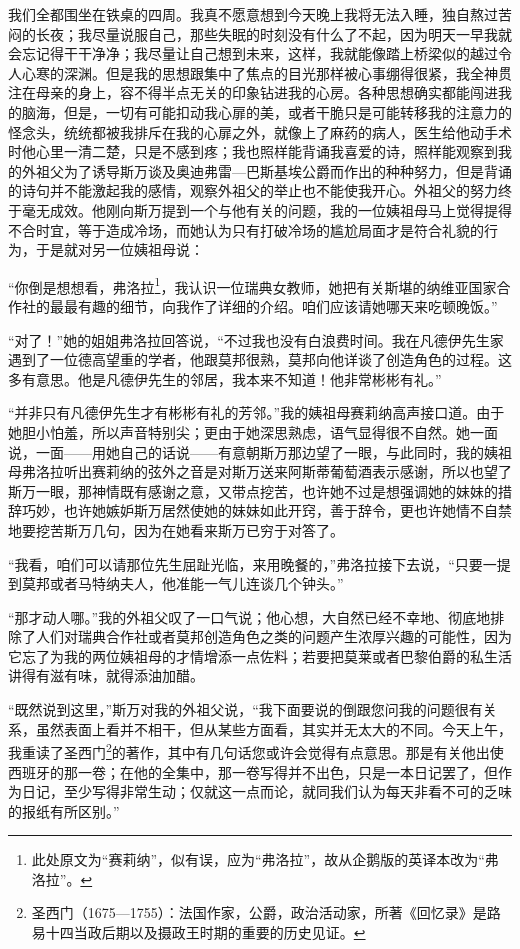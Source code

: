 \par 我们全都围坐在铁桌的四周。我真不愿意想到今天晚上我将无法入睡，独自熬过苦闷的长夜；我尽量说服自己，那些失眠的时刻没有什么了不起，因为明天一早我就会忘记得干干净净；我尽量让自己想到未来，这样，我就能像踏上桥梁似的越过令人心寒的深渊。但是我的思想跟集中了焦点的目光那样被心事绷得很紧，我全神贯注在母亲的身上，容不得半点无关的印象钻进我的心房。各种思想确实都能闯进我的脑海，但是，一切有可能扣动我心扉的美，或者干脆只是可能转移我的注意力的怪念头，统统都被我排斥在我的心扉之外，就像上了麻药的病人，医生给他动手术时他心里一清二楚，只是不感到疼；我也照样能背诵我喜爱的诗，照样能观察到我的外祖父为了诱导斯万谈及奥迪弗雷—巴斯基埃公爵而作出的种种努力，但是背诵的诗句并不能激起我的感情，观察外祖父的举止也不能使我开心。外祖父的努力终于毫无成效。他刚向斯万提到一个与他有关的问题，我的一位姨祖母马上觉得提得不合时宜，等于造成冷场，而她认为只有打破冷场的尴尬局面才是符合礼貌的行为，于是就对另一位姨祖母说：
\par “你倒是想想看，弗洛拉\footnote{此处原文为“赛莉纳”，似有误，应为“弗洛拉”，故从企鹅版的英译本改为“弗洛拉”。}，我认识一位瑞典女教师，她把有关斯堪的纳维亚国家合作社的最最有趣的细节，向我作了详细的介绍。咱们应该请她哪天来吃顿晚饭。”
\par “对了！”她的姐姐弗洛拉回答说，“不过我也没有白浪费时间。我在凡德伊先生家遇到了一位德高望重的学者，他跟莫邦很熟，莫邦向他详谈了创造角色的过程。这多有意思。他是凡德伊先生的邻居，我本来不知道！他非常彬彬有礼。”
\par “并非只有凡德伊先生才有彬彬有礼的芳邻。”我的姨祖母赛莉纳高声接口道。由于她胆小怕羞，所以声音特别尖；更由于她深思熟虑，语气显得很不自然。她一面说，一面——用她自己的话说——有意朝斯万那边望了一眼，与此同时，我的姨祖母弗洛拉听出赛莉纳的弦外之音是对斯万送来阿斯蒂葡萄酒表示感谢，所以也望了斯万一眼，那神情既有感谢之意，又带点挖苦，也许她不过是想强调她的妹妹的措辞巧妙，也许她嫉妒斯万居然使她的妹妹如此开窍，善于辞令，更也许她情不自禁地要挖苦斯万几句，因为在她看来斯万已穷于对答了。
\par “我看，咱们可以请那位先生屈趾光临，来用晚餐的，”弗洛拉接下去说，“只要一提到莫邦或者马特纳夫人，他准能一气儿连谈几个钟头。”
\par “那才动人哪。”我的外祖父叹了一口气说；他心想，大自然已经不幸地、彻底地排除了人们对瑞典合作社或者莫邦创造角色之类的问题产生浓厚兴趣的可能性，因为它忘了为我的两位姨祖母的才情增添一点佐料；若要把莫莱或者巴黎伯爵的私生活讲得有滋有味，就得添油加醋。
\par “既然说到这里，”斯万对我的外祖父说，“我下面要说的倒跟您问我的问题很有关系，虽然表面上看并不相干，但从某些方面看，其实并无太大的不同。今天上午，我重读了圣西门\footnote{圣西门（1675—1755）：法国作家，公爵，政治活动家，所著《回忆录》是路易十四当政后期以及摄政王时期的重要的历史见证。}的著作，其中有几句话您或许会觉得有点意思。那是有关他出使西班牙的那一卷；在他的全集中，那一卷写得并不出色，只是一本日记罢了，但作为日记，至少写得非常生动；仅就这一点而论，就同我们认为每天非看不可的乏味的报纸有所区别。”
